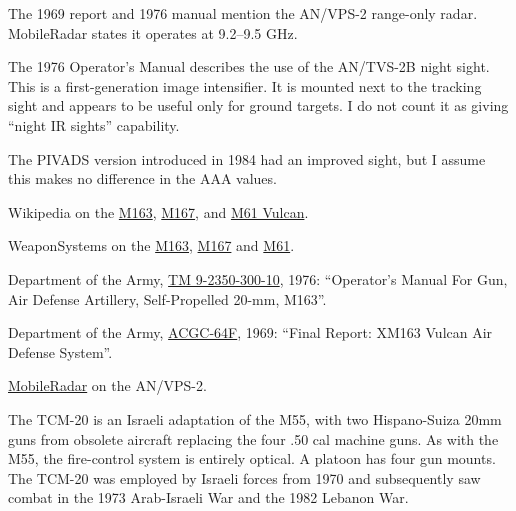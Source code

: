\begin{withcounters}
{        The 1969 report and 1976 manual mention the AN/VPS-2 range-only radar. MobileRadar states it operates at 9.2--9.5 GHz.

        The 1976 Operator's Manual describes the use of the AN/TVS-2B night sight. This is a first-generation image intensifier. It is mounted next to the tracking sight and appears to be useful only for ground targets.  I do not count it as giving “night IR sights” capability.

        The PIVADS version introduced in 1984 had an improved sight, but I assume this makes no difference in the AAA values.

        \begin{notesources}
            \item Wikipedia on the \href{https://en.wikipedia.org/wiki/M163_VADS}{M163}, \href{https://en.wikipedia.org/wiki/M167_VADS}{M167}, and \href{https://en.wikipedia.org/wiki/M61_Vulcan}{M61 Vulcan}.
            \item WeaponSystems on the \href{https://weaponsystems.net/system/67-M163+Vulcan}{M163}, \href{https://weaponsystems.net/system/150-M167+Vulcan}{M167} and \href{https://weaponsystems.net/system/1510-20mm\%20M61\%20Vulcan}{M61}.
            \item Department of the Army, \href{https://archive.org/details/TM9235030010M163VADS/mode/2up}{TM 9-2350-300-10}, 1976: “Operator's Manual For Gun, Air Defense Artillery, Self-Propelled 20-mm, M163”.
            \item Department of the Army, \href{https://apps.dtic.mil/sti/tr/pdf/AD0857327.pdf}{ACGC-64F}, 1969: “Final Report: XM163 Vulcan Air Defense System”.
            \item \href{https://www.mobileradar.org/radar_descptn_3.html}{MobileRadar} on the AN/VPS-2.
        \end{notesources}
    }


    The TCM-20 is an Israeli adaptation of the M55, with two Hispano-Suiza 20mm guns from obsolete aircraft replacing the four .50 cal machine guns. As with the M55, the fire-control system is entirely optical. A platoon has four gun mounts.
    The TCM-20 was employed by Israeli forces from 1970 and subsequently saw combat in the 1973 Arab-Israeli War and the 1982 Lebanon War.%
\end{withcounters}
